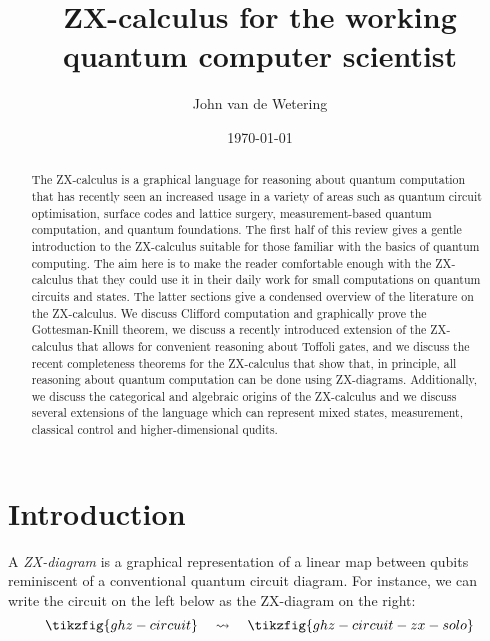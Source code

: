 \documentclass[a4paper,onecolumn,superscriptaddress,11pt,%
				unpublished,%
				allowfontchageintitle,%
				]{quantumarticle}
\begin{document}
\title{\LARGE ZX-calculus for the working quantum computer scientist}
\date{\today}

\author{John van de Wetering}

\begin{abstract} 
  The ZX-calculus is a graphical language for reasoning about quantum computation that has recently seen an increased usage in a variety of areas such as quantum circuit optimisation, surface codes and lattice surgery, measurement-based quantum computation, and quantum foundations.
  The first half of this review gives a gentle introduction to the ZX-calculus suitable for those familiar with the basics of quantum computing. The aim here is to make the reader comfortable enough with the ZX-calculus that they could use it in their daily work for small computations on quantum circuits and states.
  The latter sections give a condensed overview of the literature on the ZX-calculus. We discuss Clifford computation and graphically prove the Gottesman-Knill theorem, we discuss a recently introduced extension of the ZX-calculus that allows for convenient reasoning about Toffoli gates, and we discuss the recent completeness theorems for the ZX-calculus that show that, in principle, all reasoning about quantum computation can be done using ZX-diagrams.
  Additionally, we discuss the categorical and algebraic origins of the ZX-calculus and we discuss several extensions of the language which can represent mixed states, measurement, classical control and higher-dimensional qudits.
\end{abstract} 

\tableofcontents

\listoffigures

\maketitle


\section{Introduction}

A \emph{ZX-diagram} is a graphical representation of a linear map between qubits reminiscent of a  conventional quantum circuit diagram. For instance, we can write the circuit on the left below as the ZX-diagram on the right:
\[\tikzfig{ghz-circuit} \quad \rightsquigarrow \quad \tikzfig{ghz-circuit-zx-solo}\]
\end{document}
